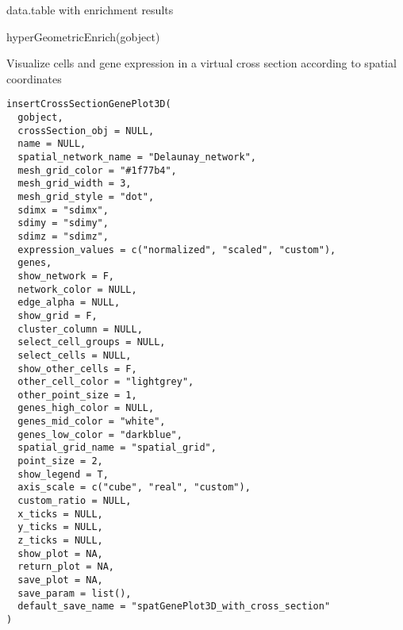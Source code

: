 \documentclass[a4paper]{book}
\begin{document}
%
\begin{Value}
data.table with enrichment results
\end{Value}
%
\begin{Examples}
\begin{ExampleCode}
    hyperGeometricEnrich(gobject)
\end{ExampleCode}
\end{Examples}
%
\begin{Description}\relax
Visualize cells and gene expression in a virtual cross section according to spatial coordinates
\end{Description}
%
\begin{Usage}
\begin{verbatim}
insertCrossSectionGenePlot3D(
  gobject,
  crossSection_obj = NULL,
  name = NULL,
  spatial_network_name = "Delaunay_network",
  mesh_grid_color = "#1f77b4",
  mesh_grid_width = 3,
  mesh_grid_style = "dot",
  sdimx = "sdimx",
  sdimy = "sdimy",
  sdimz = "sdimz",
  expression_values = c("normalized", "scaled", "custom"),
  genes,
  show_network = F,
  network_color = NULL,
  edge_alpha = NULL,
  show_grid = F,
  cluster_column = NULL,
  select_cell_groups = NULL,
  select_cells = NULL,
  show_other_cells = F,
  other_cell_color = "lightgrey",
  other_point_size = 1,
  genes_high_color = NULL,
  genes_mid_color = "white",
  genes_low_color = "darkblue",
  spatial_grid_name = "spatial_grid",
  point_size = 2,
  show_legend = T,
  axis_scale = c("cube", "real", "custom"),
  custom_ratio = NULL,
  x_ticks = NULL,
  y_ticks = NULL,
  z_ticks = NULL,
  show_plot = NA,
  return_plot = NA,
  save_plot = NA,
  save_param = list(),
  default_save_name = "spatGenePlot3D_with_cross_section"
)
\end{verbatim}
\end{Usage}
%
\end{document}
